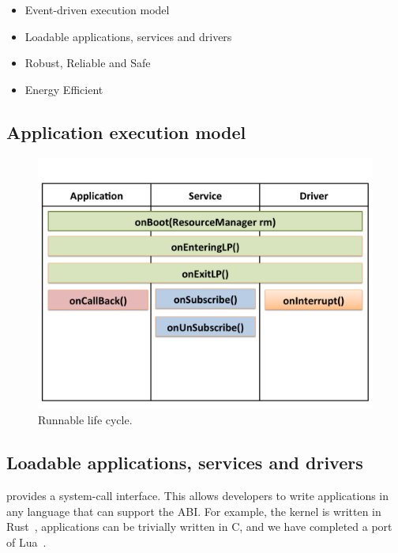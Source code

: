 \begin{itemize}
  \item Event-driven execution model
  \item Loadable applications, services and drivers
  \item Robust, Reliable and Safe %
  \item Energy Efficient 
\end{itemize}



\subsection{Application execution model}
\begin{figure}
 \centering
\includegraphics[width=1\columnwidth]{img/appcycle.png}
\caption{Runnable life cycle.}
 \label{fig:appcycle}
\end{figure}


\subsection{Loadable applications, services and drivers}

\name provides a system-call interface. This
allows developers to write applications in any language that can support the
ABI. For example, the \name kernel is written in Rust~\cite{rust}, applications
can be trivially written in C, and we have completed a port of Lua~\cite{lua}.

